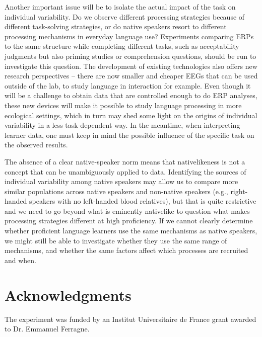 \documentclass[output=paper,colorlinks,citecolor=brown,modfonts,nonflat]{../langscibook}
\begin{document}
Another important issue will be to isolate the actual impact of the task on individual variability. Do we observe different processing strategies because of different task-solving strategies, or do native speakers resort to different processing mechanisms in everyday language use? Experiments comparing ERPs to the same structure while completing different tasks, such as acceptability judgments but also priming studies or comprehension questions, should be run to investigate this question. The development of existing technologies also offers new research perspectives – there are now smaller and cheaper EEGs that can be used outside of the lab, to study language in interaction for example. Even though it will be a challenge to obtain data that are controlled enough to do ERP analyses, these  new devices will make it possible to study language processing in more ecological settings, which in turn may shed some light on the origins of individual variability in a less task-dependent way. In the meantime, when interpreting learner data, one must keep in mind the possible influence of the specific task on the observed results. 

The absence of a clear native-speaker norm means that nativelikeness is not a concept that can be unambiguously applied to data. Identifying the sources of individual variability among native speakers may allow us to compare more similar populations across native speakers and non-native speakers (e.g., right-handed speakers with no left-handed blood relatives), but that is quite restrictive and we need to go beyond what is eminently nativelike to question what makes processing strategies different at high proficiency. If we cannot clearly determine whether proficient language learners use the same mechanisms as native speakers, we might still be able to investigate whether they use the same range of mechanisms, and whether the same factors affect which processes are recruited and when. 

\section*{Acknowledgments}
The experiment was funded by an Institut Universitaire de France grant awarded to Dr. Emmanuel Ferragne.

{\sloppy\printbibliography[heading=subbibliography,notkeyword=this]}
\end{document}
